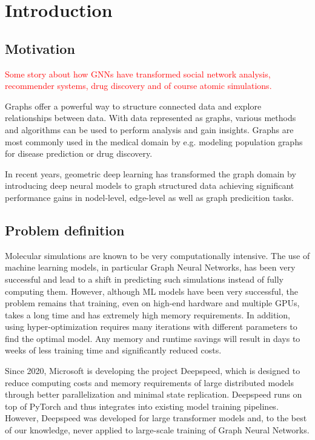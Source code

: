 \section{Introduction}

\subsection{Motivation}

\textcolor{red}{Some story about how GNNs have transformed social network analysis, recommender systems, drug discovery and of course 
atomic simulations.}

Graphs offer a powerful way to structure connected data and explore relationships between data. With data represented 
as graphs, various methods and algorithms can be used to perform analysis and gain insights. Graphs are most commonly 
used in the medical domain by e.g. modeling population graphs for disease prediction or drug discovery.

In recent years, geometric deep learning has transformed the graph domain by introducing deep neural models to graph 
structured data achieving significant performance gains in nodel-level, edge-level as well as graph predicition tasks. 


\subsection{Problem definition}

Molecular simulations are known to be very computationally intensive. The use of machine learning models, in particular 
Graph Neural Networks, has been very successful and lead to a shift in predicting such simulations instead of 
fully computing them. However, although ML models have been very successful, the problem remains that training, 
even on high-end hardware and multiple GPUs, takes a long time and has extremely high memory requirements. In 
addition, using hyper-optimization requires many iterations with different parameters to find the optimal model. 
Any memory and runtime savings will result in days to weeks of less training time and significantly reduced costs.

Since 2020, Microsoft is developing the project Deepspeed, which is designed to reduce computing costs and memory 
requirements of large distributed models through better parallelization and minimal state replication. Deepspeed 
runs on top of PyTorch and thus integrates into existing model training pipelines. However, Deepspeed was developed 
for large transformer models and, to the best of our knowledge, never applied to large-scale training of Graph Neural Networks.

